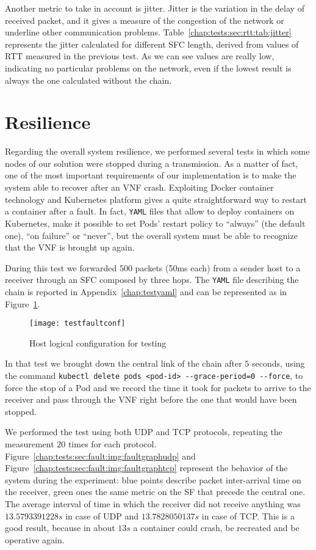 \noindent
Another metric to take in account is jitter. Jitter is the variation in the
delay of received packet, and it gives a measure of the congestion of the
network or underline other communication problems.
Table~\ref{chap:tests:sec:rtt:tab:jitter} represents the jitter calculated for
different SFC length, derived from values of RTT measured in the previous test.
As we can see values are really low, indicating no particular problems on the
network, even if the lowest result is always the one calculated without the
chain.

\section{Resilience}
Regarding the overall system resilience, we performed several tests in which
some nodes of our solution were stopped during a transmission. As a matter of
fact, one of the most important requirements of our implementation is to
make the system able to recover after an VNF crash. Exploiting Docker container
technology and Kubernetes platform gives a quite straightforward way to restart
a container after a fault. In fact, \texttt{YAML} files that allow to deploy
containers on Kubernetes, make it possible to set Pods' restart policy to
``always'' (the default one), ``on failure'' or ``never'', but the overall
system must be able to recognize that the VNF is brought up again. 

During this test we forwarded 500 packets (50ms each) from a sender
host to a receiver through an SFC composed by three hops. The \texttt{YAML} file
describing the chain is reported in Appendix~\ref{chap:testyaml} and can be
represented as in Figure~\ref{chap:tests:sec:fault:img:testfaultconf}.
\begin{figure}[H]
  \centering
  \texttt{[image: testfaultconf]}
  \caption{Host logical configuration for testing}
  \label{chap:tests:sec:fault:img:testfaultconf}
\end{figure}

\noindent
In that test we brought down the central link of the chain after $5$ seconds,
using the command \verb!kubectl delete pods <pod-id> --grace-period=0 --force!,
to force the stop of a Pod and we record the time it took for packets to arrive
to the receiver and pass through the VNF right before the one that would have
been stopped.

We performed the test using both UDP and TCP protocols, repeating the
measurement $20$ times for each protocol.
Figure~\ref{chap:tests:sec:fault:img:faultgraphudp} and
Figure~\ref{chap:tests:sec:fault:img:faultgraphtcp} represent the behavior of
the system during the experiment: blue points describe packet inter-arrival
time on the receiver, green ones the same metric on the SF that precede the
central one. The average interval of time in which the receiver did not receive
anything was $13.5793391228s$ in case of UDP and $13.7828050137s$ in case of
TCP. This is a good result, because in about $13s$ a container could crash, be
recreated and be operative again.

